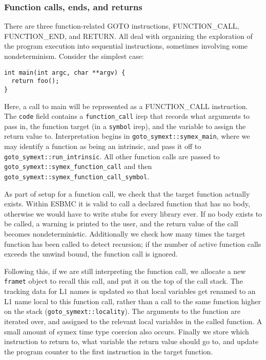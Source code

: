 \documentclass{article}
\begin{document}
\subsubsection{Function calls, ends, and returns}

There are three function-related GOTO instructions, FUNCTION\_CALL,
FUNCTION\_END, and RETURN. All deal with organizing the exploration of
the program execution into sequential instructions, sometimes involving
some nondeterminism. Consider the simplest case:

\begin{lstlisting}
int main(int argc, char **argv) {
  return foo();
}
\end{lstlisting}

Here, a call to main will be represented as a FUNCTION\_CALL instruction.
The \texttt{code} field contains a \texttt{function\_call} irep that
records what arguments to pass in, the function target (in a \texttt{symbol}
irep), and the variable to assign the return value to. Interpretation begins
in \texttt{goto\_symext::symex\_main}, where we may identify a function as
being an intrinsic, and pass it off to \texttt{goto\_symext::run\_intrinsic}.
All other function calls are passed to
\texttt{goto\_symext::symex\_function\_call} and then
\texttt{goto\_symext::symex\_function\_call\_symbol}.

As part of setup for a function call, we check that the target function
actually exists. Within ESBMC it is valid to call a declared function that has
no body, otherwise we would have to write stubs for every library ever. If no
body exists to be called, a warning is printed to the user, and the return value
of the call becomes nondeterministic. Additionally we check how many times
the target function has been called to detect recursion; if the number of
active function calls exceeds the unwind bound, the function call is ignored.

Following this, if we are still interpreting the function call, we allocate a
new \texttt{framet} object to recall this call, and put it on the top of the
call stack. The tracking data for L1 names is updated so that local variables
get renamed to an L1 name local to this function call, rather than a call to
the same function higher on the stack (\texttt{goto\_symext::locality}).
The arguments to the function are iterated over, and assigned to the relevant
local variables in the called function. A small amount of symex time type
coercion also occurs. Finally we store which instruction to return to, what
variable the return value should go to, and update the program counter to the
first instruction in the target function.
\end{document}
